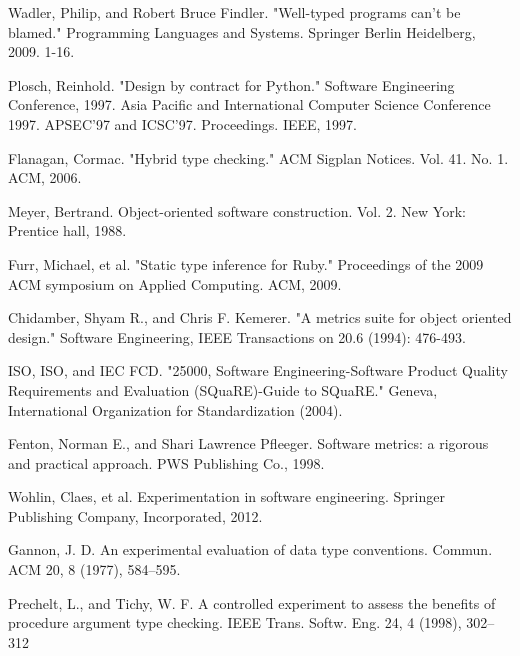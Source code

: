 \documentclass[preprint]{sigplanconf}
\begin{document}
\begin{thebibliography}{}
Wadler, Philip, and Robert Bruce Findler. "Well-typed programs can’t be blamed." Programming Languages and Systems. Springer Berlin Heidelberg, 2009. 1-16.

Plosch, Reinhold. "Design by contract for Python." Software Engineering Conference, 1997. Asia Pacific and International Computer Science Conference 1997. APSEC'97 and ICSC'97. Proceedings. IEEE, 1997.

Flanagan, Cormac. "Hybrid type checking." ACM Sigplan Notices. Vol. 41. No. 1. ACM, 2006.

Meyer, Bertrand. Object-oriented software construction. Vol. 2. New York: Prentice hall, 1988.

Furr, Michael, et al. "Static type inference for Ruby." Proceedings of the 2009 ACM symposium on Applied Computing. ACM, 2009.

Chidamber, Shyam R., and Chris F. Kemerer. "A metrics suite for object oriented design." Software Engineering, IEEE Transactions on 20.6 (1994): 476-493.

ISO, ISO, and IEC FCD. "25000, Software Engineering-Software Product Quality Requirements and Evaluation (SQuaRE)-Guide to SQuaRE." Geneva, International Organization for Standardization (2004).

Fenton, Norman E., and Shari Lawrence Pfleeger. Software metrics: a rigorous and practical approach. PWS Publishing Co., 1998.

Wohlin, Claes, et al. Experimentation in software engineering. Springer Publishing Company, Incorporated, 2012.

Gannon, J. D. An experimental evaluation of data type conventions. Commun. ACM 20, 8 (1977), 584–595.

\bibitem[Prechelt(1998)]{Prechelt98]}
Prechelt, L., and Tichy, W. F. A controlled experiment to assess the beneﬁts of procedure argument type checking. IEEE Trans. Softw. Eng. 24, 4 (1998), 302–312


\end{thebibliography}
\end{document}
